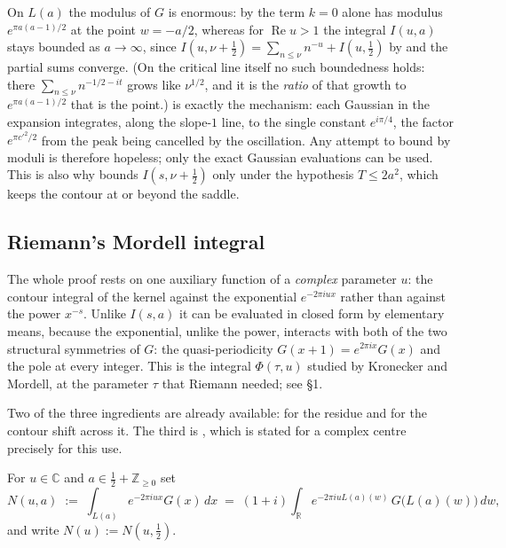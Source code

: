 \begin{remark}
\label{rem:rsz_cancellation}
On $L(a)$ the modulus of $G$ is enormous: by  the term $k=0$ alone
has modulus $e^{\pi a(a-1)/2}$ at the point $w=-a/2$, whereas for $\operatorname{Re}u>1$ the
integral $I(u,a)$ stays bounded as $a\to\infty$, since
$I(u,\nu+\tfrac12)=\sum_{n\le\nu}n^{-u}+I(u,\tfrac12)$ by  and the
partial sums converge.  (On the critical line itself no such boundedness holds: there
$\sum_{n\le\nu}n^{-1/2-it}$ grows like $\nu^{1/2}$, and it is the \emph{ratio} of that
growth to $e^{\pi a(a-1)/2}$ that is the point.)   is exactly the
mechanism: each Gaussian in the expansion integrates, along the slope-$1$ line, to the
single constant $e^{i\pi/4}$, the factor $e^{\pi c'^{2}/2}$ from the peak being cancelled by
the oscillation.  Any attempt to bound  by moduli is therefore
hopeless; only the exact Gaussian evaluations can be used.  This is also why
 bounds $I(s,\nu+\tfrac12)$ only under the hypothesis
$T\le2a^{2}$, which keeps the contour at or beyond the saddle.
\end{remark}

\subsection{Riemann's Mordell integral}
\label{sec:rsz_mordell}

The whole proof rests on one auxiliary function of a \emph{complex} parameter $u$: the
contour integral of the kernel against the exponential $e^{-2\pi iux}$ rather than against
the power $x^{-s}$.  Unlike $I(s,a)$ it can be evaluated in closed form by elementary means,
because the exponential, unlike the power, interacts with both of the two structural
symmetries of $G$: the quasi-periodicity $G(x+1)=e^{2\pi ix}G(x)$ and the pole at every
integer.  This is the integral $\varPhi(\tau,u)$ studied by Kronecker and Mordell, at the
parameter $\tau$ that Riemann needed; see \cite{Siegel1932} \S1.

Two of the three ingredients are already available:  for the
residue and  for the contour shift across it.  The third is
, which is stated for a complex centre precisely for this use.

\begin{definition}
\label{def:rsz_mordell}
\leanok
{}
For $u\in\mathbb{C}$ and $a\in\tfrac12+\mathbb{Z}_{\ge0}$ set
\[
  N(u,a)\;:=\;\int_{L(a)}e^{-2\pi iux}G(x)\,dx
    \;=\;(1+i)\int_{\mathbb{R}}e^{-2\pi iuL(a)(w)}\,G\bigl(L(a)(w)\bigr)\,dw ,
\]
and write $N(u):=N(u,\tfrac12)$.
\end{definition}

